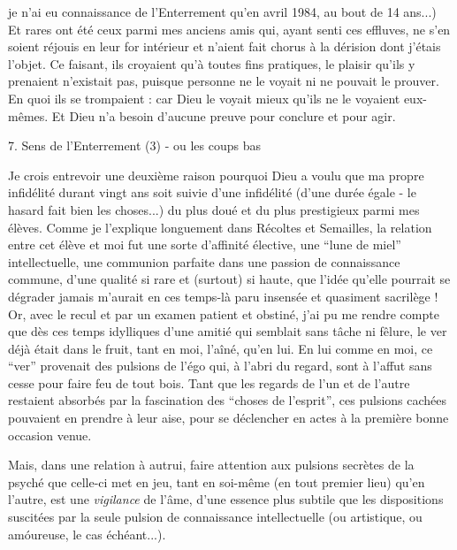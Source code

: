 
je n'ai eu connaissance de l'Enterrement qu'en avril 1984, au bout de 14 ans...) Et rares ont été ceux parmi mes anciens amis qui, ayant senti ces effluves, ne s'en soient réjouis en leur for intérieur et n'aient fait chorus à la dérision dont j'étais l'objet. Ce faisant, ils croyaient qu'à toutes fins pratiques, le plaisir qu'ils y prenaient n'existait pas, puisque personne ne le voyait ni ne pouvait le prouver. En quoi ils se trompaient : car Dieu le voyait mieux qu'ils ne le voyaient eux-mêmes. Et Dieu n'a besoin d'aucune preuve pour conclure et pour agir.

7. Sens de l'Enterrement (3) - ou les coups bas

Je crois entrevoir une deuxième raison pourquoi Dieu a voulu que ma propre infidélité durant vingt ans soit suivie d'une infidélité (d'une durée égale - le hasard fait bien les choses...) du plus doué et du plus prestigieux parmi mes élèves. Comme je l'explique longuement dans Récoltes et Semailles, la relation entre cet élève et moi fut une sorte d'affinité élective, une ``lune de miel'' intellectuelle, une communion parfaite dans une passion de connaissance commune, d'une qualité si rare et (surtout) si haute, que l'idée qu'elle pourrait se dégrader jamais m'aurait en ces temps-là paru insensée et quasiment sacrilège ! Or, avec le recul et par un examen patient et obstiné, j'ai pu me rendre compte que dès ces temps idylliques d'une amitié qui semblait sans tâche ni fêlure, le ver déjà était dans le fruit, tant en moi, l'aîné, qu'en lui. En lui comme en moi, ce ``ver'' provenait des pulsions de l'égo qui, à l'abri du regard, sont à l'affut sans cesse pour faire feu de tout bois. Tant que les regards de l'un et de l'autre restaient absorbés par la fascination des ``choses de l'esprit'', ces pulsions cachées pouvaient en prendre à leur aise, pour se déclencher en actes à la première bonne occasion venue.

Mais, dans une relation à autrui, faire attention aux pulsions secrètes de la psyché que celle-ci met en jeu, tant en soi-même (en tout premier lieu) qu'en l'autre, est une \textit{vigilance} de l'âme, d'une essence plus subtile que les dispositions suscitées par la seule pulsion de connaissance intellectuelle (ou artistique, ou amóureuse, le cas échéant...).

